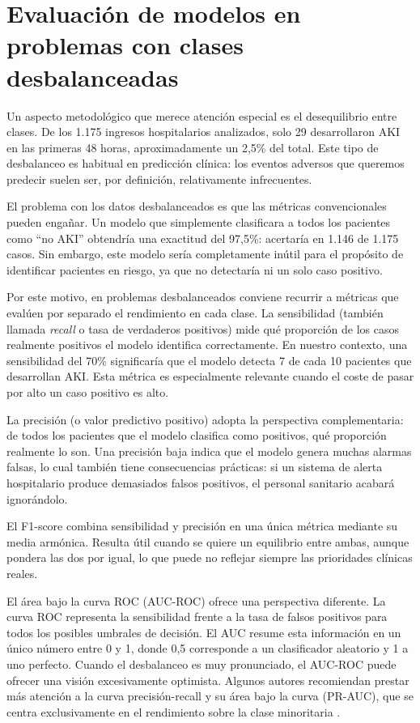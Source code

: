 \documentclass[12pt, a4paper, oneside]{report}
\begin{document}
\section{Evaluación de modelos en problemas con clases desbalanceadas}

Un aspecto metodológico que merece atención especial es el desequilibrio entre clases. De los 1.175 ingresos hospitalarios analizados, solo 29 desarrollaron AKI en las primeras 48 horas, aproximadamente un 2,5\% del total. Este tipo de desbalanceo es habitual en predicción clínica: los eventos adversos que queremos predecir suelen ser, por definición, relativamente infrecuentes.

El problema con los datos desbalanceados es que las métricas convencionales pueden engañar. Un modelo que simplemente clasificara a todos los pacientes como ``no AKI'' obtendría una exactitud del 97,5\%: acertaría en 1.146 de 1.175 casos. Sin embargo, este modelo sería completamente inútil para el propósito de identificar pacientes en riesgo, ya que no detectaría ni un solo caso positivo.

Por este motivo, en problemas desbalanceados conviene recurrir a métricas que evalúen por separado el rendimiento en cada clase. La sensibilidad (también llamada \textit{recall} o tasa de verdaderos positivos) mide qué proporción de los casos realmente positivos el modelo identifica correctamente. En nuestro contexto, una sensibilidad del 70\% significaría que el modelo detecta 7 de cada 10 pacientes que desarrollan AKI. Esta métrica es especialmente relevante cuando el coste de pasar por alto un caso positivo es alto.

La precisión (o valor predictivo positivo) adopta la perspectiva complementaria: de todos los pacientes que el modelo clasifica como positivos, qué proporción realmente lo son. Una precisión baja indica que el modelo genera muchas alarmas falsas, lo cual también tiene consecuencias prácticas: si un sistema de alerta hospitalario produce demasiados falsos positivos, el personal sanitario acabará ignorándolo.

El F1-score combina sensibilidad y precisión en una única métrica mediante su media armónica. Resulta útil cuando se quiere un equilibrio entre ambas, aunque pondera las dos por igual, lo que puede no reflejar siempre las prioridades clínicas reales.

El área bajo la curva ROC (AUC-ROC) ofrece una perspectiva diferente. La curva ROC representa la sensibilidad frente a la tasa de falsos positivos para todos los posibles umbrales de decisión. El AUC resume esta información en un único número entre 0 y 1, donde 0,5 corresponde a un clasificador aleatorio y 1 a uno perfecto. Cuando el desbalanceo es muy pronunciado, el AUC-ROC puede ofrecer una visión excesivamente optimista. Algunos autores recomiendan prestar más atención a la curva precisión-recall y su área bajo la curva (PR-AUC), que se centra exclusivamente en el rendimiento sobre la clase minoritaria \parencite{saito2015prroc}.
\end{document}
